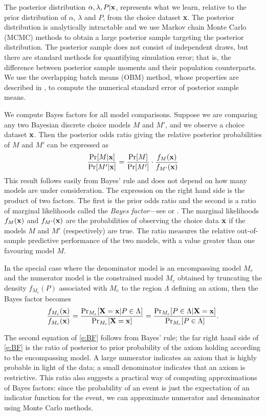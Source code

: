 \documentclass[11pt,letter]{article}
\begin{document}
The posterior distribution $\alpha,\lambda,P|{\bf x}$, represents what we learn, relative to the prior distribution of $\alpha$, $\lambda$ and $P$, from the choice dataset {\bf x}.
The posterior distribution is analytically intractable and we use Markov chain Monte Carlo (MCMC) methods to obtain a large posterior sample targeting the posterior distribution.
The posterior sample does not consist of independent draws, but there are standard methods for quantifying simulation error; that is, the difference between posterior sample moments and their population counterparts.
We use the overlapping batch means (OBM) method, whose properties are described in , to compute the numerical standard error of posterior sample means.

We compute Bayes factors for all model comparisons.
Suppose we are comparing any two Bayesian discrete choice models $M$ and $M'$, and we observe a choice dataset ${\bf x}$.
Then the posterior odds ratio giving the relative posterior probabilities of $M$ and $M'$ can be expressed as
\[
  \frac{\Pr[M|{\bf x}]}{\Pr[M'|{\bf x}]} = \frac{\Pr[M]}{\Pr[M']}
  \cdot
  \frac{f_{M}({\bf x})}{f_{M'}({\bf x})}
\]
This result follows easily from Bayes' rule and does not depend on how many models are under consideration.
The expression on the right hand side is the product of two factors.
The first is the prior odds ratio and the second is a ratio of marginal likelihoods called the {\em Bayes factor}---see  or .
The marginal likelihoods $f_{M}({\bf x})$ and $f_{M'}({\bf x})$ are the probabilities of observing the choice data ${\bf x}$ if the models $M$ and $M'$ (respectively) are true.
The ratio measures the relative out-of-sample predictive performance of the two models, with a value greater than one favouring model $M$.

In the special case where the denominator model is an encompassing model $M_e$ and the numerator model is the constrained model $M_c$ obtained by truncating the density $f_{M_e}(P)$ associated with $M_e$ to the region $\Lambda$ defining an axiom, then the Bayes factor becomes
\begin{equation}\label{e:BF}
  \frac{f_{M_c}({\bf x})}{f_{M_e}({\bf x})} =
  \frac{\Pr_{M_e}[{\bf X} = {\bf x}|P \in \Lambda]}{\Pr_{M_e}[{\bf X} = {\bf x}]} = \frac{\Pr_{M_e}[P \in \Lambda|{\bf X} = {\bf x}]}{\Pr_{M_e}[P \in \Lambda]}.
\end{equation}

The second equation of \eqref{e:BF} follows from Bayes' rule; the far right hand side of \eqref{e:BF} is the ratio of posterior to prior probability of the axiom holding according to the encompassing model.
A large numerator indicates an axiom that is highly probable in light of the data; a small denominator indicates that an axiom is restrictive.
This ratio also suggests a practical way of computing approximations of Bayes factors: since the probability of an event is just the expectation of an indicator function for the event, we can approximate numerator and denominator using Monte Carlo methods.
\end{document}
